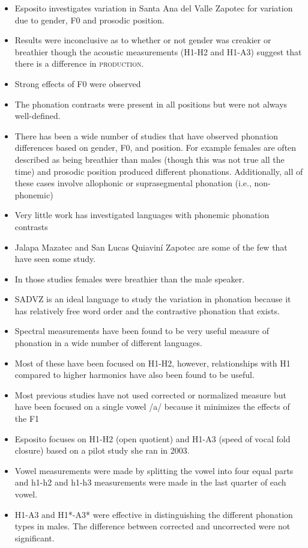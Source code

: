\documentclass[12pt, letterpaper]{article}
\begin{document}
\begin{itemize}
	\item Esposito investigates variation in Santa Ana del Valle Zapotec for variation due to gender, F0 and prosodic position.
	\item Results were inconclusive as to whether or not gender was creakier or breathier though the acoustic measurements (H1-H2 and H1-A3) suggest that there is a difference in \textsc{production}. 
	\item Strong effects of F0 were observed
	\item The phonation contrasts were present in all positions but were not always well-defined. 
	\item There has been a wide number of studies that have observed phonation differences based on gender, F0, and position. For example females are often described as being breathier than males (though this was not true all the time) and prosodic position produced different phonations. Additionally, all of these cases involve allophonic or suprasegmental phonation (i.e., non-phonemic)
	\item Very little work has investigated languages with phonemic phonation contrasts
	\item Jalapa Mazatec and San Lucas Quiaviní Zapotec are some of the few that have seen some study.
	\item In those studies females were breathier than the male speaker. 
	\item SADVZ is an ideal language to study the variation in phonation because it has relatively free word order and the contrastive phonation that exists. 
	\item Spectral measurements have been found to be very useful measure of phonation in a wide number of different languages. 
	\item Most of these have been focused on H1-H2, however, relationships with H1 compared to higher harmonics have also been found to be useful. 
	\item Most previous studies have not used corrected or normalized measure but have been focused on a single vowel /a/ because it minimizes the effects of the F1
	\item Esposito focuses on H1-H2 (open quotient) and H1-A3 (speed of vocal fold closure) based on a pilot study she ran in 2003. 
	\item Vowel measurements were made by splitting the vowel into four equal parts and h1-h2 and h1-h3 measurements were made in the last quarter of each vowel. 
	\item H1-A3 and H1*-A3* were effective in distinguishing the different phonation types in males. The difference between corrected and uncorrected were not significant. 

\end{itemize}
\end{document}
